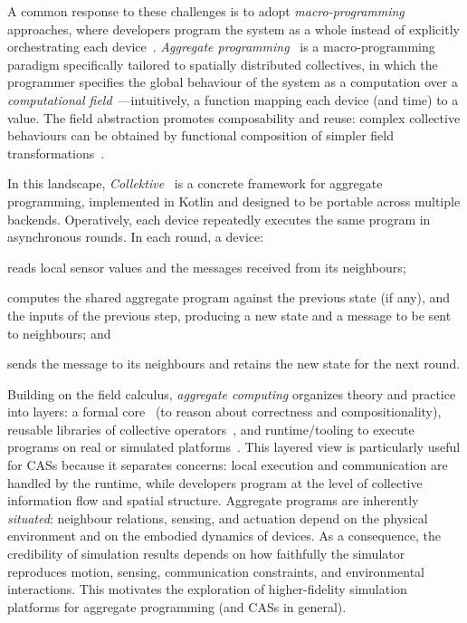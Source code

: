 \documentclass[runningheads]{llncs}
\newenvironment{inlinelist}{\begin{enumerate*}[label=\emph{(\roman*)}]}{\end{enumerate*}}
\begin{document}
A common response to these challenges is to adopt \emph{macro-programming}~\cite{DBLP:journals/csur/Casadei23} approaches,
where developers
program the system as a whole instead of explicitly orchestrating each device~\cite{DBLP:journals/jlap/ViroliBDACP19}.
%
\emph{Aggregate programming}~\cite{BealIEEEComputer2015} is a macro-programming paradigm specifically tailored to spatially distributed
collectives, in which the programmer specifies the global behaviour of the system as a computation over
a \emph{computational field}~\cite{DBLP:journals/tocl/AudritoVDPB19}---intuitively, a function mapping each device (and time) to a value.
%
The field abstraction promotes composability and reuse: complex collective behaviours can be obtained by
functional composition of simpler field transformations~\cite{DBLP:journals/tomacs/ViroliABDP18}.

In this landscape, \emph{Collektive}~\cite{DBLP:conf/acsos/Cortecchia24} is a concrete framework for aggregate programming,
implemented in Kotlin and designed to be portable across multiple backends.
%
Operatively,
each device repeatedly executes the same program in asynchronous rounds.
In each round, a device:
\begin{inlinelist}
    \item reads local sensor values and the messages received from its neighbours;
    \item computes the shared aggregate program against the previous state (if any), and the inputs of the previous step,
    producing a new state and a message to be sent to neighbours; and
    \item sends the message to its neighbours and retains the new state for the next round.
\end{inlinelist}

Building on the field calculus, \emph{aggregate computing} organizes theory and practice into layers:
a formal core~\cite{DBLP:journals/tocl/AudritoVDPB19} (to reason about correctness and compositionality),
reusable libraries of collective
operators~\cite{DBLP:journals/tomacs/ViroliABDP18},
and runtime/tooling to execute programs on real or simulated platforms~\cite{DBLP:conf/sac/PianiniVB15,DBLP:journals/softx/CasadeiVAP22,DBLP:journals/scp/AudritoT24}.
%
This layered view is particularly useful for \acp{CAS} because it separates concerns:
local execution and communication are handled by the runtime, while developers program at the level of
collective information flow and spatial structure.
%
Aggregate programs are inherently \emph{situated}: neighbour relations, sensing, and actuation depend on the
physical environment and on the embodied dynamics of devices.
%
As a consequence, the credibility of simulation results depends
on how faithfully the simulator reproduces motion, sensing, communication constraints, and environmental
interactions.
%
This motivates the exploration of higher-fidelity simulation platforms for
aggregate programming (and \acp{CAS} in general).
\end{document}
